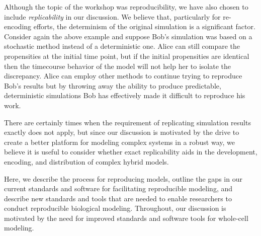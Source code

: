 \documentclass[journal,transmag,twoside]{IEEEtran}
\begin{document}

Although the topic of the workshop was reproducibility, we have also chosen to include \textit{replicability} in our discussion. We believe that, particularly for re-encoding efforts, the determinism of the original simulation is a significant factor. Consider again the above example and suppose Bob's simulation was based on a stochastic method instead of a deterministic one. Alice can still compare the propensities at the initial time point, but if the initial propensities are identical then the timecourse behavior of the model will not help her to isolate the discrepancy. Alice can employ other methods to continue trying to reproduce Bob's results but by throwing away the ability to produce predictable, deterministic simulations Bob has effectively made it difficult to reproduce his work.

There are certainly times when the requirement of replicating simulation results exactly does not apply, but since our discussion is motivated by the drive to create a better platform for modeling complex systems in a robust way, we believe it is useful to consider whether exact replicability aids in the development, encoding, and distribution of complex hybrid models.


Here, we describe the process for reproducing models, outline the gaps in our current standards and software for facilitating
reproducible modeling, and describe new standards and tools that are needed to enable researchers to conduct reproducible
biological modeling. Throughout, our discussion is motivated by the need for improved standards and software tools for whole-cell modeling.
\end{document}
